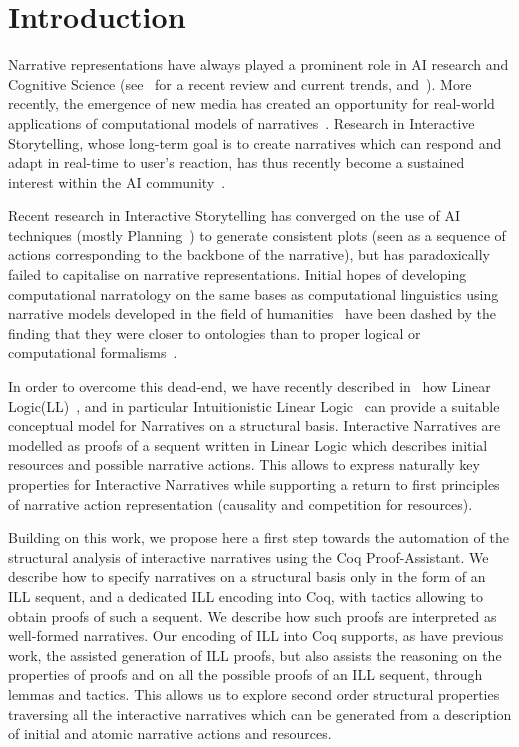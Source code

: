 \documentclass[runningheads,a4paper]{llncs}
\begin{document}
\section{Introduction}
%
Narrative representations have always played a prominent role in AI research and Cognitive Science (see~\cite{Richards09} for a recent review and current trends, and~\cite{AAAI10}). More recently, the emergence of new media has created an opportunity for real-world applications of computational models of narratives~\cite{Laurel93,Murray98}. Research in Interactive Storytelling, whose long-term goal is to create narratives which can respond and adapt in real-time to user's reaction, has thus recently become a sustained interest within the AI community~\cite{AAAI07,AAAI09}.

Recent research in Interactive Storytelling has converged on the use of AI techniques (mostly Planning~\cite{Young99}) to generate consistent plots (seen as a sequence of actions corresponding to the backbone of the narrative), but has paradoxically failed to capitalise on narrative representations. Initial hopes of developing computational narratology on the same bases as computational linguistics using narrative models developed in the field of humanities~\cite{Greimas66,Bremond73} have been dashed by the finding that they were closer to ontologies than to proper logical or computational formalisms~\cite{Cavazza06}.

In order to overcome this dead-end, we have recently described in~\cite{bosser10} how Linear Logic(LL)~\cite{GirardTCS87}, and in particular Intuitionistic Linear Logic~\cite{GirardILL87} can provide a suitable conceptual model for Narratives on a structural basis. Interactive Narratives are modelled as proofs of a sequent written in Linear Logic which describes initial resources and possible narrative actions. This allows to express naturally key properties for Interactive Narratives while supporting a return to first principles of narrative action representation (causality and competition for resources).

Building on this work, we propose here a first step towards the automation of the structural analysis of interactive narratives using the Coq Proof-Assistant. We describe how to specify narratives on a structural basis only in the form of an ILL sequent, and a dedicated ILL encoding into Coq, with tactics allowing to obtain proofs of such a sequent. We describe how such proofs are interpreted as well-formed narratives. Our encoding of ILL into Coq supports, as have previous work, the assisted generation of ILL proofs, but also assists the reasoning on the properties of proofs and on all the possible proofs of an ILL sequent, through lemmas and tactics. This allows us to explore second order structural properties traversing all the interactive narratives which can be generated from a description of initial and atomic narrative actions and resources.
\end{document}
